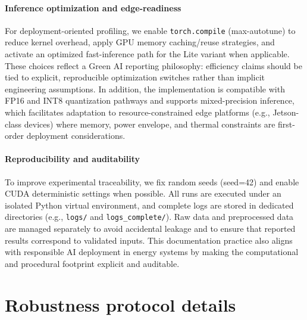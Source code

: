 \documentclass[review,3p,times]{elsarticle}
\begin{document}
\paragraph{Inference optimization and edge-readiness}
For deployment-oriented profiling, we enable \texttt{torch.compile} (max-autotune) to reduce kernel overhead, apply GPU memory caching/reuse strategies, and activate an optimized fast-inference path for the Lite variant when applicable. These choices reflect a Green AI reporting philosophy: efficiency claims should be tied to explicit, reproducible optimization switches rather than implicit engineering assumptions. In addition, the implementation is compatible with FP16 and INT8 quantization pathways and supports mixed-precision inference, which facilitates adaptation to resource-constrained edge platforms (e.g., Jetson-class devices) where memory, power envelope, and thermal constraints are first-order deployment considerations.

\paragraph{Reproducibility and auditability}
To improve experimental traceability, we fix random seeds (seed=42) and enable CUDA deterministic settings when possible. All runs are executed under an isolated Python virtual environment, and complete logs are stored in dedicated directories (e.g., \texttt{logs/} and \texttt{logs\_complete/}). Raw data and preprocessed data are managed separately to avoid accidental leakage and to ensure that reported results correspond to validated inputs. This documentation practice also aligns with responsible AI deployment in energy systems by making the computational and procedural footprint explicit and auditable.

\section{Robustness protocol details}\label{app:robust_details}
\end{document}
